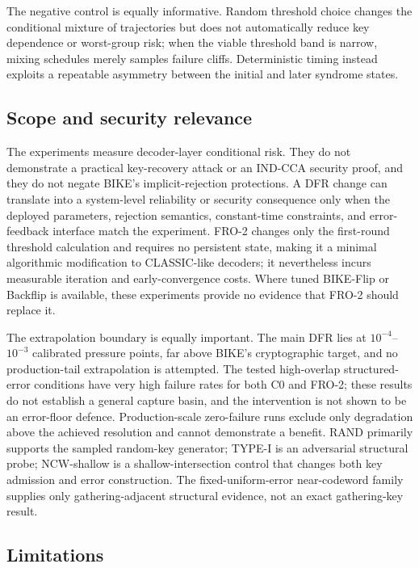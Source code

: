 \documentclass[lettersize,journal]{IEEEtran}
\begin{document}
The negative control is equally informative. Random threshold choice changes the conditional mixture of trajectories but does not automatically reduce key dependence or worst-group risk; when the viable threshold band is narrow, mixing schedules merely samples failure cliffs. Deterministic timing instead exploits a repeatable asymmetry between the initial and later syndrome states.

\subsection{Scope and security relevance}

The experiments measure decoder-layer conditional risk. They do not demonstrate a practical key-recovery attack or an IND-CCA security proof, and they do not negate BIKE's implicit-rejection protections. A DFR change can translate into a system-level reliability or security consequence only when the deployed parameters, rejection semantics, constant-time constraints, and error-feedback interface match the experiment. FRO-2 changes only the first-round threshold calculation and requires no persistent state, making it a minimal algorithmic modification to CLASSIC-like decoders; it nevertheless incurs measurable iteration and early-convergence costs. Where tuned BIKE-Flip or Backflip is available, these experiments provide no evidence that FRO-2 should replace it.

The extrapolation boundary is equally important. The main DFR lies at $10^{-4}$--$10^{-3}$ calibrated pressure points, far above BIKE's cryptographic target, and no production-tail extrapolation is attempted. The tested high-overlap structured-error conditions have very high failure rates for both C0 and FRO-2; these results do not establish a general capture basin, and the intervention is not shown to be an error-floor defence. Production-scale zero-failure runs exclude only degradation above the achieved resolution and cannot demonstrate a benefit. RAND primarily supports the sampled random-key generator; TYPE-I is an adversarial structural probe; NCW-shallow is a shallow-intersection control that changes both key admission and error construction. The fixed-uniform-error near-codeword family supplies only gathering-adjacent structural evidence, not an exact gathering-key result.

\subsection{Limitations}
\end{document}
